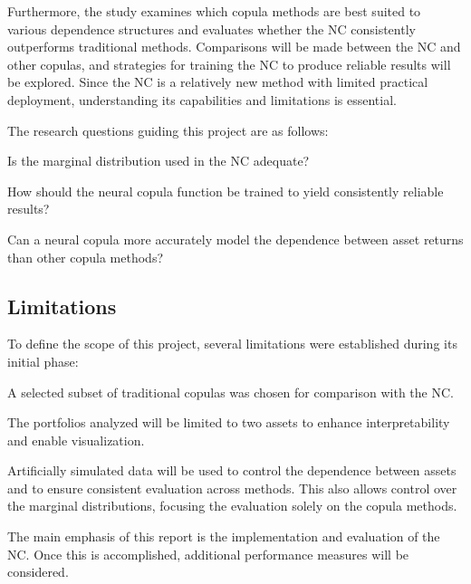 Furthermore, the study examines which copula methods are best suited to various dependence structures and evaluates whether the \gls{NC} consistently outperforms traditional methods. Comparisons will be made between the \gls{NC} and other copulas, and strategies for training the \gls{NC} to produce reliable results will be explored. Since the \gls{NC} is a relatively new method with limited practical deployment, understanding its capabilities and limitations is essential.

The research questions guiding this project are as follows:
\begin{compactenum}[{\bfseries RQ}1]
    \item \label{item:RQ1} Is the marginal distribution used in the \gls{NC} adequate?
    \item \label{item:RQ2} How should the neural copula function be trained to yield consistently reliable results?
    \item \label{item:RQ3} Can a neural copula more accurately model the dependence between asset returns than other copula methods?
\end{compactenum}
\newcommand{\RQone}{{\bfseries RQ}\ref{item:RQ1} }
\newcommand{\RQtwo}{{\bfseries RQ}\ref{item:RQ2} }
\newcommand{\RQthree}{{\bfseries RQ}\ref{item:RQ3} }

\subsection{Limitations}\label{Limitations}
To define the scope of this project, several limitations were established during its initial phase:

\begin{compactenum}
    \item A selected subset of traditional copulas was chosen for comparison with the \gls{NC}.
    \item The portfolios analyzed will be limited to two assets to enhance interpretability and enable visualization.
    \item Artificially simulated data will be used to control the dependence between assets and to ensure consistent evaluation across methods. This also allows control over the marginal distributions, focusing the evaluation solely on the copula methods.
    \item The main emphasis of this report is the implementation and evaluation of the \gls{NC}. Once this is accomplished, additional performance measures will be considered.
\end{compactenum}


